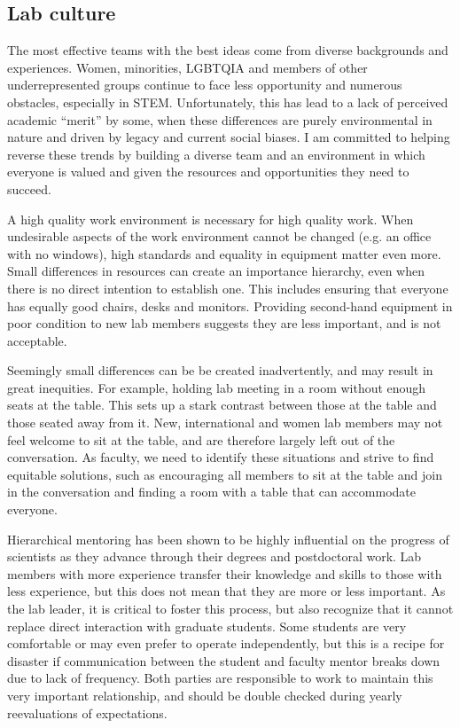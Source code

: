 \documentclass[11pt]{article}
\begin{document}
\subsection*{Lab culture}

The most effective teams with the best ideas come from diverse backgrounds and experiences. Women, minorities, LGBTQIA and members of other underrepresented groups continue to face less opportunity and numerous obstacles, especially in STEM. Unfortunately, this has lead to a lack of perceived academic ``merit'' by some, when these differences are purely environmental in nature and driven by legacy and current social biases. I am committed to helping reverse these trends by building a diverse team and an environment in which everyone is valued and given the resources and opportunities they need to succeed. 

A high quality work environment is necessary for high quality work. When undesirable aspects of the work environment cannot be changed (e.g. an office with no windows), high standards and equality in equipment matter even more. Small differences in resources can create an importance hierarchy, even when there is no direct intention to establish one. This includes ensuring that everyone has equally good chairs, desks and monitors. Providing second-hand equipment in poor condition to new lab members suggests they are less important, and is not acceptable.

Seemingly small differences can be be created inadvertently, and may result in great inequities. For example, holding lab meeting in a room without enough seats at the table. This sets up a stark contrast between those at the table and those seated away from it. New, international and women lab members may not feel welcome to sit at the table, and are therefore largely left out of the conversation. As faculty, we need to identify these situations and strive to find equitable solutions, such as encouraging all members to sit at the table and join in the conversation and finding a room with a table that can accommodate everyone. 

Hierarchical mentoring has been shown to be highly influential on the progress of scientists as they advance through their degrees and postdoctoral work. Lab members with more experience transfer their knowledge and skills to those with less experience, but this does not mean that they are more or less important. As the lab leader, it is critical to foster this process, but also recognize that it cannot replace direct interaction with graduate students. Some students are very comfortable or may even prefer to operate independently, but this is a recipe for disaster if communication between the student and faculty mentor breaks down due to lack of frequency. Both parties are responsible to work to maintain this very important relationship, and should be double checked during yearly reevaluations of expectations.
\end{document}
